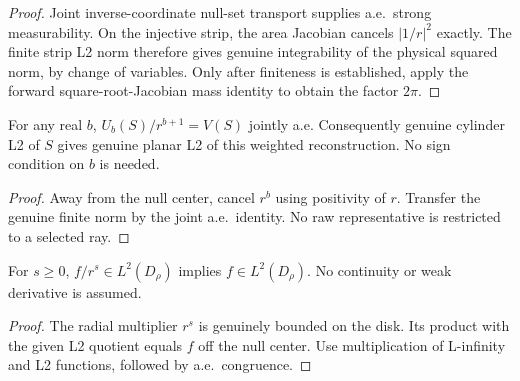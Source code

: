 \begin{proof}
\leanok
Joint inverse-coordinate null-set transport supplies a.e.\ strong measurability.
On the injective strip, the area Jacobian cancels $|1/r|^2$ exactly.
The finite strip L2 norm therefore gives genuine integrability of the physical
squared norm, by change of variables. Only after finiteness is established,
apply the forward square-root-Jacobian mass identity to obtain the factor $2\pi$.
\end{proof}

\begin{lemma}
\label{lem:cylinder-physical-weighted-l2}
\leanok
For any real $b$, $U_b(S)/r^{b+1}=V(S)$ jointly a.e.
Consequently genuine cylinder L2 of $S$ gives genuine planar L2 of this
weighted reconstruction. No sign condition on $b$ is needed.
\end{lemma}

\begin{proof}
\leanok
Away from the null center, cancel $r^b$ using positivity of $r$.
Transfer the genuine finite norm by the joint a.e.\ identity.
No raw representative is restricted to a selected ray.
\end{proof}

\begin{lemma}
\label{lem:radial-weight-restore-l2}
\leanok
For $s\ge0$, $f/r^s\in L^2(D_\rho)$ implies $f\in L^2(D_\rho)$.
No continuity or weak derivative is assumed.
\end{lemma}

\begin{proof}
\leanok
The radial multiplier $r^s$ is genuinely bounded on the disk.
Its product with the given L2 quotient equals $f$ off the null center.
Use multiplication of L-infinity and L2 functions, followed by a.e.\ congruence.
\end{proof}

